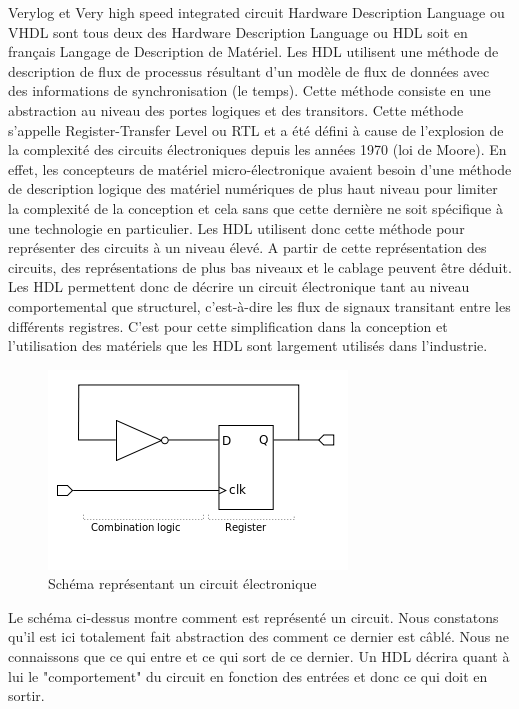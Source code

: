 \vspace{15px}
\par
Verylog et Very high speed integrated circuit Hardware Description Language ou VHDL sont tous deux des Hardware Description Language ou HDL soit en français Langage de Description de Matériel. Les HDL utilisent une méthode de description de flux de processus résultant d'un modèle de flux de données avec des informations de synchronisation (le temps). Cette méthode consiste en une abstraction au niveau des portes logiques et des transitors. Cette méthode s'appelle Register-Transfer Level ou RTL et a été défini à cause de l'explosion de la complexité des circuits électroniques depuis les années 1970 (loi de Moore). En effet, les concepteurs de matériel micro-électronique avaient besoin d'une méthode de description logique des matériel numériques de plus haut niveau pour limiter la complexité de la conception et cela sans que cette dernière ne soit spécifique à une technologie en particulier. Les HDL utilisent donc cette méthode pour représenter des circuits à un niveau élevé. A partir de cette représentation des circuits, des représentations de plus bas niveaux et le cablage peuvent être déduit. Les HDL permettent donc de décrire un circuit électronique tant au niveau comportemental que structurel, c'est-à-dire les flux de signaux transitant entre les différents registres. C'est pour cette simplification dans la conception et l'utilisation des matériels que les HDL sont largement utilisés dans l'industrie.
\newpage
\begin{figure}[h!]
\includegraphics{rtl_example.png}
\caption{Schéma représentant un circuit électronique}  
\end{figure} 
\par
Le schéma ci-dessus montre comment est représenté un circuit. Nous constatons qu'il est ici totalement fait abstraction des comment ce dernier est câblé. Nous ne connaissons que ce qui entre et ce qui sort de ce dernier. Un HDL décrira quant à lui le "comportement" du circuit en fonction des entrées et donc ce qui doit en sortir.
